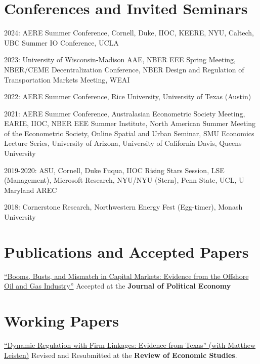 \documentclass[margin,line]{res}
\newenvironment{list1}{
  \begin{list}{\ding{113}}{%
      \setlength{\itemsep}{.025in}
      \setlength{\parsep}{0in} \setlength{\parskip}{0in}
      \setlength{\topsep}{0in} \setlength{\partopsep}{0in}
      \setlength{\leftmargin}{0.17in}}}{\end{list}}
\begin{document}
\begin{resume}
\section{ Conferences and Invited Seminars}
\begin{list1}
\item[] 2024: AERE Summer Conference, Cornell, Duke, IIOC, KEERE, NYU, Caltech, UBC Summer IO Conference, UCLA
\item[] 2023: University of Wisconsin-Madison AAE, NBER EEE Spring Meeting, NBER/CEME Decentralization Conference, NBER Design and Regulation of Transportation Markets Meeting, WEAI
\item[] 2022: AERE Summer Conference, Rice University, University of Texas (Austin)
\item[] 2021: AERE Summer Conference, Australasian Econometric Society Meeting, EARIE, IIOC, NBER EEE Summer Institute, North American Summer Meeting of the Econometric Society, Online Spatial and Urban Seminar, SMU Economics Lecture Series, University of Arizona, University of California Davis, Queens University
\item[] 2019-2020: ASU, Cornell, Duke Fuqua, IIOC Rising Stars Session, LSE (Management), Microsoft Research, NYU/NYU (Stern), Penn State, UCL, U Maryland AREC
\item[] 2018:  Cornerstone Research, Northwestern Energy Fest (Egg-timer), Monash University
\end{list1}

\section{Publications and Accepted Papers}
\begin{list1}
\item[] \href{https://nvreug.github.io/paper/bbm.pdf}{``Booms, Busts, and Mismatch in Capital Markets: Evidence from the Offshore Oil and Gas Industry''} Accepted at the \textbf{Journal of Political Economy}
\end{list1}

\section{Working Papers}
\begin{list1}

\item[] \href{ https://www.dropbox.com/s/ceqvc55q4hxpi4b/Dynamic_Regulation_with_Firm_Linkages.pdf?dl=0}{``Dynamic Regulation with Firm Linkages: Evidence from Texas'' (with Matthew Leisten)} Revised and Resubmitted at the \textbf{Review of Economic Studies}.


\end{list1}
\end{resume}
\end{document}
